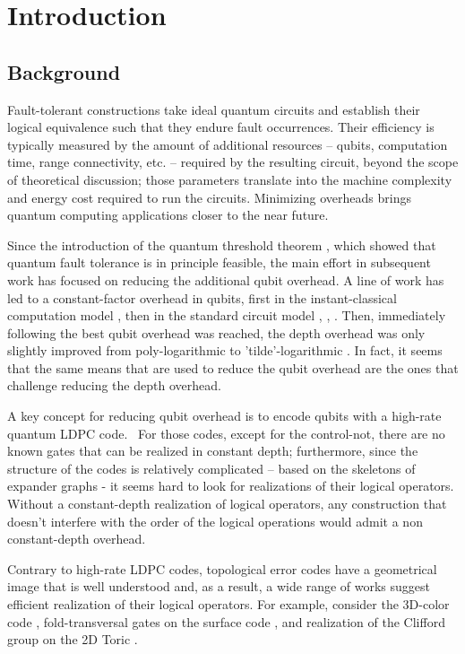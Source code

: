 \section{Introduction}

\subsection{Background}

Fault-tolerant constructions take ideal quantum circuits and establish their logical equivalence such that they endure fault occurrences. Their efficiency is typically measured by the amount of additional resources – qubits, computation time, range connectivity, etc. – required by the resulting circuit, beyond the scope of theoretical discussion; those parameters translate into the machine complexity and energy cost required to run the circuits. Minimizing overheads brings quantum computing applications closer to the near future.

Since the introduction of the quantum threshold theorem \cite{aharonov1999faulttolerant} \cite{Ninequ}, which showed that quantum fault tolerance is in principle feasible, the main effort in subsequent work has focused on reducing the additional qubit overhead. A line of work has led to a constant-factor overhead in qubits, first in the instant-classical computation model \cite{gottesman2014faulttolerant}, then in the standard circuit model \cite{grospellier:tel-03364419}, \cite{Fawzi_2018}, \cite{ nguyen2025quantumfaulttoleranceconstantspace}. Then, immediately following the best qubit overhead was reached, the depth overhead was only slightly improved from poly-logarithmic to 'tilde'-logarithmic \cite{ nguyen2025quantumfaulttoleranceconstantspace}. In fact, it seems that the same means that are used to reduce the qubit overhead are the ones that challenge reducing the depth overhead.    

A key concept for reducing qubit overhead is to encode qubits with a high-rate quantum LDPC code.  For those codes, except for the control-not, there are no known gates that can be realized in constant depth; furthermore, since the structure of the codes is relatively complicated – based on the skeletons of expander graphs - it seems hard to look for realizations of their logical operators. Without a constant-depth realization of logical operators, any construction that doesn't interfere with the order of the logical operations would admit a non constant-depth overhead. 

Contrary to high-rate LDPC codes, topological error codes have a geometrical image that is well understood and, as a result, a wide range of works suggest efficient realization of their logical operators. For example, consider the 3D-color code \cite{Bombín_2015}, fold-transversal gates on the surface code \cite{Breuckmann_2024}, and realization of the Clifford group on the 2D Toric \cite{guernut2024faulttolerantconstantdepthcliffordgates}.

